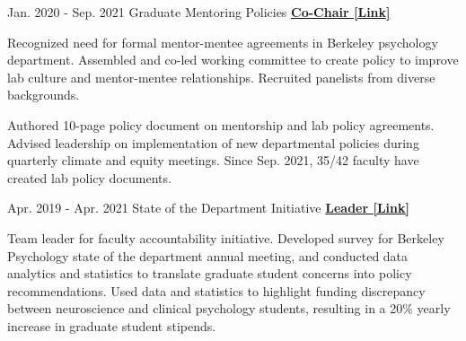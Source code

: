 


\begin{cventries}

  \cventry 
    {Jan. 2020 - Sep. 2021} %
    {Graduate Mentoring Policies}
    {\href{http://ivrylab.berkeley.edu/uploads/4/1/1/5/41152143/cognac_lab_policies_19feb2021.pdf}{\textbf{Co-Chair [Link]}}} %
    {} %
    {
      \begin{cvitems} %
        \item {Recognized need for formal mentor-mentee agreements in Berkeley psychology department. Assembled and co-led working committee to create policy to improve lab culture and mentor-mentee relationships. Recruited panelists from diverse backgrounds.}
        \item {Authored 10-page policy document on mentorship and lab policy agreements. Advised leadership on implementation of new departmental policies during quarterly climate and equity meetings. Since Sep. 2021, 35/42 faculty have created lab policy documents.}
      \end{cvitems}
    }
    
  \cventry 
    {Apr. 2019 - Apr. 2021} %
    {State of the Department Initiative}
    {\href{https://drive.google.com/file/d/1wD7y5gW39EU4vQUyhcrO7Fra1Ttc_HyG/view?usp=sharing}{\textbf{Leader [Link]}}} %
    {} %
    {
      \begin{cvitems} %
      	\item {Team leader for faculty accountability initiative. Developed survey for Berkeley Psychology state of the department annual meeting, and conducted data analytics and statistics to translate graduate student concerns into policy recommendations. Used data and statistics to highlight funding discrepancy between neuroscience and clinical psychology students, resulting in a 20\% yearly increase in graduate student stipends.}
      \end{cvitems}
    }
  

\end{cventries}
